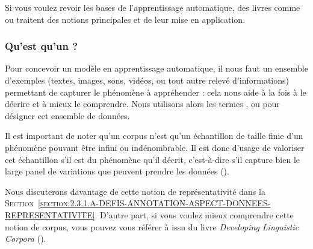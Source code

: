 			\begin{leftBarInformation}
				Si vous voulez revoir les bases de l'apprentissage automatique, des livres comme \cite{zhou:2021:machine-learning} ou \cite{raschka-mirjalili:2019:python-machine-learning} traitent des notions principales et de leur mise en application.
			\end{leftBarInformation}
			
		\subsubsection{Qu'est qu'un \textguillemets{\texttt{corpus d'entraînement}} ?}
		\label{section:2.1.1.B-PRESENTATION-ANNOTATION-DEFINITION-BASE-APPRENTISSAGE}

			Pour concevoir un modèle en apprentissage automatique, il nous faut un ensemble d'exemples (textes, images, sons, vidéos, ou tout autre relevé d'informations) permettant de capturer le phénomène à appréhender : cela nous aide à la fois à le décrire et à mieux le comprendre.
			Nous utilisons alors les termes ,  ou  pour désigner cet ensemble de données.
			
			Il est important de noter qu'un corpus n'est qu'un échantillon de taille finie d'un phénomène pouvant être infini ou indénombrable.
			Il est donc d'usage de valoriser cet échantillon s'il est  du phénomène qu'il décrit, c'est-à-dire s'il capture bien le large panel de variations que peuvent prendre les données (\cite{biber:1993:representativeness-corpus-design}).
			
			\begin{leftBarInformation}
				Nous discuterons davantage de cette notion de représentativité dans la \textsc{Section~\ref{section:2.3.1.A-DEFIS-ANNOTATION-ASPECT-DONNEES-REPRESENTATIVITE}}.
				D'autre part, si vous voulez mieux comprendre cette notion de corpus, vous pouvez vous référer à \cite{sinclair:2004:corpus-text-basic} issu du livre \textit{Developing Linguistic Corpora} (\cite{wynne:2004:developing-linguistic-corpora}).
			\end{leftBarInformation}
		
